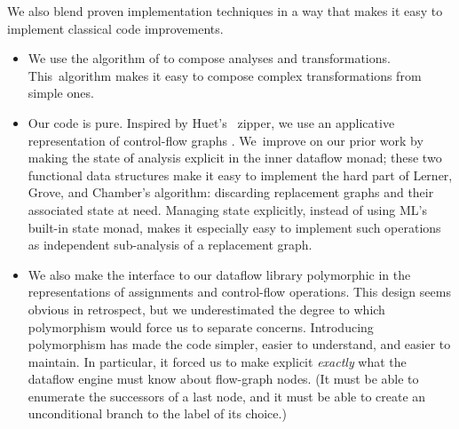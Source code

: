 \documentclass[blockstyle,preprint,natbib,nocopyrightspace]{sigplanconf}
\let\cite\citep
\newcommand{\authornote}[1]{{\em #1}}
\def\authornote#1{\unskip\relax}
\newcommand{\simon}[1]{\authornote{SLPJ: #1}}
\def\finalremark#1{\relax}
\begin{document}
We also blend proven implementation techniques
in a way that
makes it easy
to implement classical code improvements.
\begin{itemize}
\item
We use the algorithm of \citet{lerner-grove-chambers:2002} to 
compose analyses and transformations.
This~algorithm makes it easy to compose complex transformations
from simple ones.
\item
Our code is pure.
Inspired by Huet's~\citeyearpar{huet:zipper} zipper,
we use an applicative representation of
control-flow graphs
\cite{ramsey-dias:applicative-flow-graph}. 
We~improve on our prior work by making the state of analysis
explicit in the inner dataflow monad;
these two functional data structures make it easy to implement the hard
part of Lerner, Grove, and Chamber's algorithm: discarding replacement
graphs and their associated state at need.
Managing state explicitly, instead of
using ML's built-in state monad, 
makes it especially easy to implement such
operations as independent sub-analysis of a replacement graph. \simon{This 
last sentence is a repeat of the previous one.}
%
%
\item
We also make 
the interface to our dataflow library polymorphic in the
representations of 
assignments and control-flow operations.
%
This design seems obvious in retrospect,
but we underestimated the degree to which polymorphism would force us to
separate concerns.
Introducing polymorphism has made the code simpler, easier
to understand, and easier to maintain.\finalremark
{SLPJ: Is it possible to substantiate this claim by [more] examples?}
In particular, it forced us to make explicit \emph{exactly} what the
dataflow engine must know about flow-graph nodes.
(It must be able to enumerate the successors of a last
node, and it must be able to create an unconditional branch to the
label of its choice.)
\end{itemize}
\end{document}
